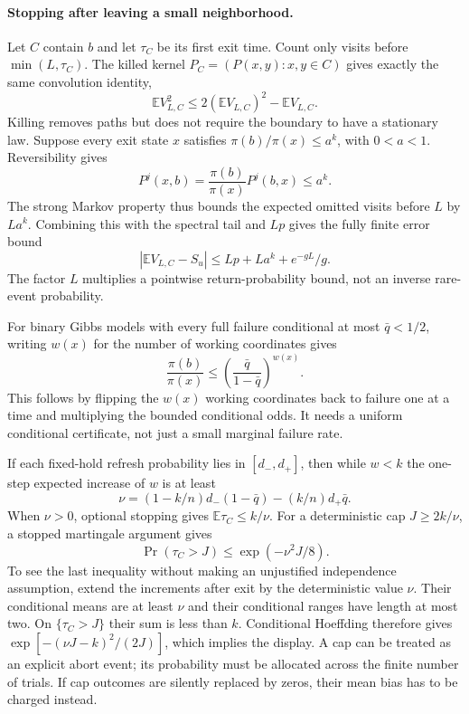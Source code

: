 \paragraph{Stopping after leaving a small neighborhood.}
Let $C$ contain $b$ and let $\tau_C$ be its first exit time.  Count only
visits before $\min(L,\tau_C)$.  The killed kernel
$P_C=(P(x,y):x,y\in C)$ gives exactly the same convolution identity,
\[
 \mathbb E V_{L,C}^2\le2(\mathbb E V_{L,C})^2-\mathbb E V_{L,C}.
\]
Killing removes paths but does not require the boundary to have a
stationary law.  Suppose every exit state $x$ satisfies
$\pi(b)/\pi(x)\le a^k$, with $0<a<1$.  Reversibility gives
\[
 P^j(x,b)=\frac{\pi(b)}{\pi(x)}P^j(b,x)\le a^k.
\]
The strong Markov property thus bounds the expected omitted visits before
$L$ by $La^k$.  Combining this with the spectral tail and $Lp$ gives the
fully finite error bound
\begin{equation}
 \left|\mathbb E V_{L,C}-S_u\right|
 \le Lp+La^k+e^{-gL}/g.
 \label{eq:killedreturnbias}
\end{equation}
The factor $L$ multiplies a pointwise return-probability bound, not an
inverse rare-event probability.

For binary Gibbs models with every full failure conditional at most
$\bar q<1/2$, writing $w(x)$ for the number of working coordinates gives
\[
 \frac{\pi(b)}{\pi(x)}\le
 \left(\frac{\bar q}{1-\bar q}\right)^{w(x)}.
\]
This follows by flipping the $w(x)$ working coordinates back to failure
one at a time and multiplying the bounded conditional odds.  It needs a
uniform conditional certificate, not just a small marginal failure rate.

If each fixed-hold refresh probability lies in $[d_-,d_+]$, then while
$w<k$ the one-step expected increase of $w$ is at least
\[
 \nu=(1-k/n)d_-(1-\bar q)-(k/n)d_+\bar q.
\]
When $\nu>0$, optional stopping gives $\mathbb E\tau_C\le k/\nu$.
For a deterministic cap $J\ge2k/\nu$, a stopped martingale argument gives
\[
 \Pr(\tau_C>J)\le \exp(-\nu^2J/8).
\]
To see the last inequality without making an unjustified independence
assumption, extend the increments after exit by the deterministic value
$\nu$.  Their conditional means are at least $\nu$ and their conditional
ranges have length at most two.  On $\{\tau_C>J\}$ their sum is less than
$k$.  Conditional Hoeffding therefore gives
$\exp[-(\nu J-k)^2/(2J)]$, which implies the display.
A cap can be treated as an explicit abort event; its probability must be
allocated across the finite number of trials.  If cap outcomes are
silently replaced by zeros, their mean bias has to be charged instead.

